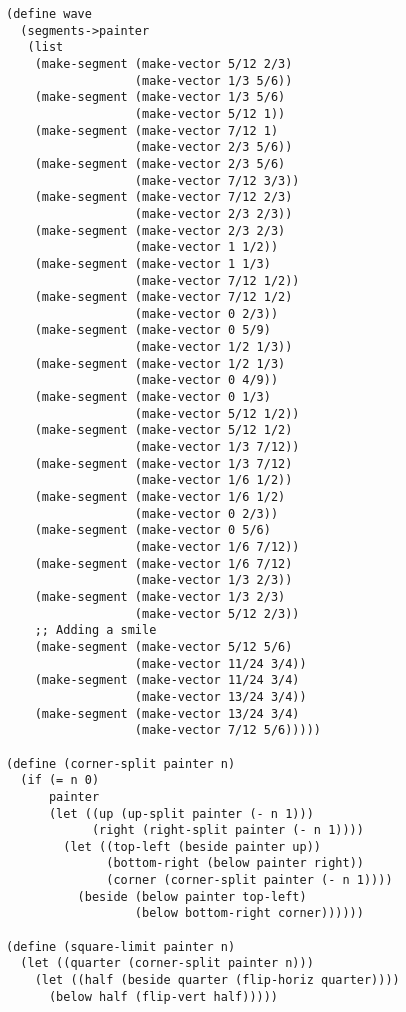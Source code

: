 \documentclass[a4paper,12pt]{article}
\begin{document}
\begin{lstlisting}
(define wave
  (segments->painter
   (list
    (make-segment (make-vector 5/12 2/3)
                  (make-vector 1/3 5/6))
    (make-segment (make-vector 1/3 5/6)
                  (make-vector 5/12 1))
    (make-segment (make-vector 7/12 1)
                  (make-vector 2/3 5/6))
    (make-segment (make-vector 2/3 5/6)
                  (make-vector 7/12 3/3))
    (make-segment (make-vector 7/12 2/3)
                  (make-vector 2/3 2/3))
    (make-segment (make-vector 2/3 2/3)
                  (make-vector 1 1/2))
    (make-segment (make-vector 1 1/3)
                  (make-vector 7/12 1/2))
    (make-segment (make-vector 7/12 1/2)
                  (make-vector 0 2/3))
    (make-segment (make-vector 0 5/9)
                  (make-vector 1/2 1/3))
    (make-segment (make-vector 1/2 1/3)
                  (make-vector 0 4/9))
    (make-segment (make-vector 0 1/3)
                  (make-vector 5/12 1/2))
    (make-segment (make-vector 5/12 1/2)
                  (make-vector 1/3 7/12))
    (make-segment (make-vector 1/3 7/12)
                  (make-vector 1/6 1/2))
    (make-segment (make-vector 1/6 1/2)
                  (make-vector 0 2/3))
    (make-segment (make-vector 0 5/6)
                  (make-vector 1/6 7/12))
    (make-segment (make-vector 1/6 7/12)
                  (make-vector 1/3 2/3))
    (make-segment (make-vector 1/3 2/3)
                  (make-vector 5/12 2/3))
    ;; Adding a smile
    (make-segment (make-vector 5/12 5/6)
                  (make-vector 11/24 3/4))
    (make-segment (make-vector 11/24 3/4)
                  (make-vector 13/24 3/4))
    (make-segment (make-vector 13/24 3/4)
                  (make-vector 7/12 5/6)))))

(define (corner-split painter n)
  (if (= n 0)
      painter
      (let ((up (up-split painter (- n 1)))
            (right (right-split painter (- n 1))))
        (let ((top-left (beside painter up))
              (bottom-right (below painter right))
              (corner (corner-split painter (- n 1))))
          (beside (below painter top-left)
                  (below bottom-right corner))))))

(define (square-limit painter n)
  (let ((quarter (corner-split painter n)))
    (let ((half (beside quarter (flip-horiz quarter))))
      (below half (flip-vert half)))))
\end{lstlisting}
\end{document}
